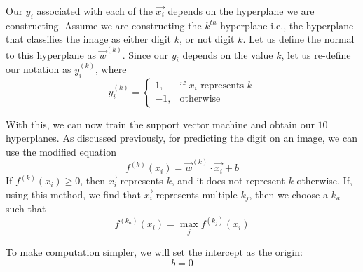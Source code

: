 Our ${y_i}$ associated with each of the $\vec{x_i}$ depends on the hyperplane we are constructing. Assume we are constructing the $k^{th}$ hyperplane i.e., the hyperplane that classifies the image as either digit $k$, or not digit $k$. Let us define the normal to this hyperplane as $\vec{w}^{(k)}$. Since our $y_i$ depends on the value $k$, let us re-define our notation as $y^{(k)}_i$, where
\begin{equation}
    y^{(k)}_i= 
\begin{cases}
 1,& \text{if } x_i \text{ represents } k\\
-1,              & \text{otherwise}
\end{cases}
\end{equation}

With this, we can now train the support vector machine and obtain our $10$ hyperplanes. As discussed previously, for predicting the digit on an image, we can use the modified equation
\begin{equation}
	f^{(k)}(x_i) = \vec{w}^{(k)}\cdot\vec{x_i} + b
\end{equation}
If $f^{(k)}(x_i) \geq 0$, then $\vec{x_i}$ represents $k$, and it does not represent $k$ otherwise. If, using this method, we find that $\vec{x_i}$ represents multiple $k_j$, then we choose a $k_a$ such that
\begin{equation}
	f^{(k_a)}(x_i) = \max_{j} f^{(k_j)}(x_i)
\end{equation}

To make computation simpler, we will set the intercept as the origin:
\begin{equation}
b = 0
\end{equation}